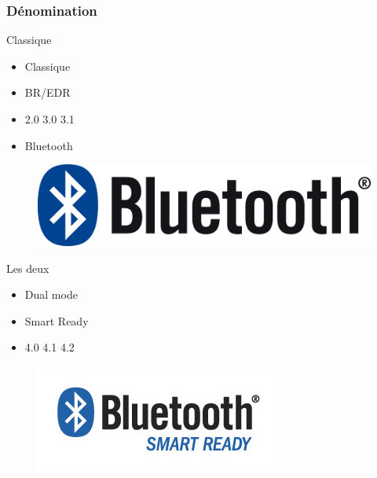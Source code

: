 \begin{frame}
	\frametitle{Dénomination}

	\begin{minipage}[t]{0.30\linewidth}
		\begin{block}{Classique}
			\begin{itemize}
				\item Classique
				\item BR/EDR
				\item 2.0 3.0 3.1
				\item Bluetooth
			\end{itemize}
		\end{block}
		\begin{figure}
			\includegraphics[width=\linewidth]{img/Bluetooth_Logo.png}
		\end{figure}
	\end{minipage}
	\begin{minipage}[t]{0.30\linewidth}
		\begin{block}{Les deux}
			\begin{itemize}
				\item Dual mode
				\item Smart Ready
				\item 4.0 4.1 4.2
			\end{itemize}
		\end{block}
		\begin{figure}
			\includegraphics[width=\linewidth]{img/Bluetooth_Smart_Ready_Logo.jpg}
		\end{figure}
	\end{minipage}
	\begin{minipage}[t]{0.30\linewidth}

\end{minipage}
\end{frame}
